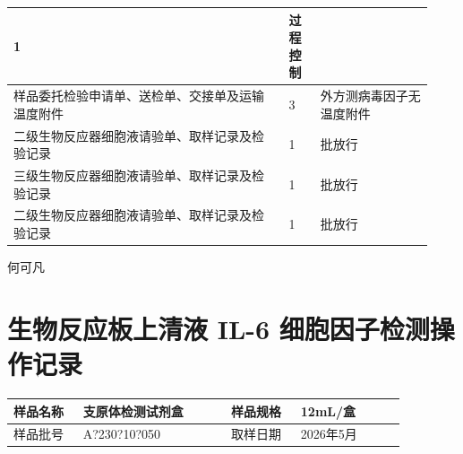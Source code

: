 \documentclass[UTF8,10pt,a4paper,fontset=fandol]{ctexart}
\newcommand{\fieldvalue}[1]{#1}
\newcommand{\handwritten}[1]{#1}
\begin{document}
\begin{center}
\begin{tabular}{|p{0.61\linewidth}|p{0.07\linewidth}|p{0.25\linewidth}|}
\fieldvalue{1} &
\fieldvalue{过程控制} \\ \hline
样品委托检验申请单、送检单、交接单及运输温度附件 &
\fieldvalue{3} &
\fieldvalue{外方测病毒因子无温度附件} \\ \hline
二级生物反应器细胞液请验单、取样记录及检验记录 &
\fieldvalue{1} &
\fieldvalue{批放行} \\ \hline
三级生物反应器细胞液请验单、取样记录及检验记录 &
\fieldvalue{1} &
\fieldvalue{批放行} \\ \hline
二级生物反应器细胞液请验单、取样记录及检验记录 &
\fieldvalue{1} &
\fieldvalue{批放行} \\ \hline
\end{tabular}
\end{center}

\handwritten{何可凡}

\newpage

\section{生物反应板上清液 IL-6 细胞因子检测操作记录}

\begin{tabular}{|p{0.16\linewidth}|p{0.34\linewidth}|p{0.16\linewidth}|p{0.24\linewidth}|}
\hline
样品名称 &
\fieldvalue{\handwritten{支原体检测试剂盒}} &
样品规格 &
\fieldvalue{\handwritten{12mL/盒}} \\
\hline
样品批号 &
\fieldvalue{\handwritten{A?230?10?050}} &
取样日期 &
\fieldvalue{\handwritten{2026年5月}} \\
\hline
\end{tabular}
\end{document}

